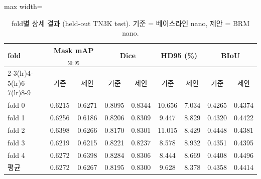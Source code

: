 \begin{table}[htbp]
\centering
\footnotesize
\caption[fold별 상세 결과 (held-out TN3K test).]{fold별 상세 결과 (held-out TN3K test). 기준 = 베이스라인 nano, 제안 = BRM nano.}
\label{tab:perfold}
\begin{adjustbox}{max width=\linewidth}
\begin{tabular}{lcccccccc}
\toprule
\multirow{2}{*}{fold} & \multicolumn{2}{c}{Mask mAP$_{50:95}$} & \multicolumn{2}{c}{Dice} & \multicolumn{2}{c}{HD95 (\%)} & \multicolumn{2}{c}{BIoU} \\
\cmidrule(lr){2-3}\cmidrule(lr){4-5}\cmidrule(lr){6-7}\cmidrule(lr){8-9}
 & 기준 & 제안 & 기준 & 제안 & 기준 & 제안 & 기준 & 제안 \\
\midrule
fold 0 & 0.6215 & 0.6271 & 0.8095 & 0.8344 & 10.656 & 7.034 & 0.4265 & 0.4374 \\
fold 1 & 0.6256 & 0.6186 & 0.8206 & 0.8309 & 9.447 & 8.829 & 0.4320 & 0.4422 \\
fold 2 & 0.6398 & 0.6266 & 0.8170 & 0.8301 & 11.015 & 8.429 & 0.4448 & 0.4381 \\
fold 3 & 0.6219 & 0.6215 & 0.8221 & 0.8237 & 8.578 & 8.932 & 0.4351 & 0.4395 \\
fold 4 & 0.6272 & 0.6398 & 0.8284 & 0.8306 & 8.444 & 8.669 & 0.4408 & 0.4496 \\
\midrule
평균 & 0.6272 & 0.6267 & 0.8195 & 0.8300 & 9.628 & 8.378 & 0.4358 & 0.4414 \\
\bottomrule
\end{tabular}
\end{adjustbox}
\end{table}
